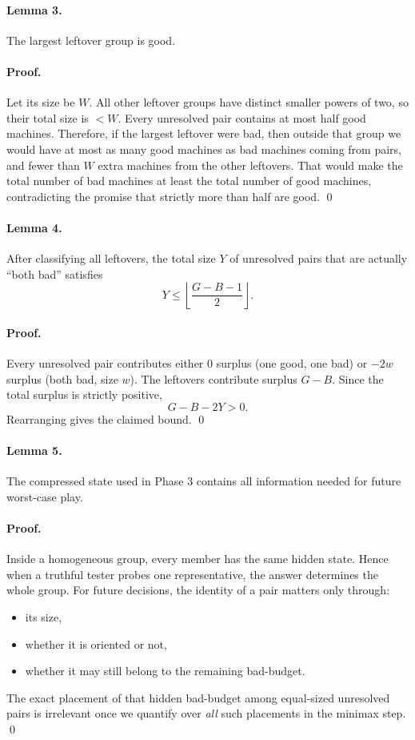 \documentclass[11pt]{article}
\begin{document}
\paragraph{Lemma 3.}
The largest leftover group is good.

\paragraph{Proof.}
Let its size be $W$. All other leftover groups have distinct smaller powers of two, so their total size is $< W$. Every unresolved pair contains at most half good machines. Therefore, if the largest leftover were bad, then outside that group we would have at most as many good machines as bad machines coming from pairs, and fewer than $W$ extra machines from the other leftovers. That would make the total number of bad machines at least the total number of good machines, contradicting the promise that strictly more than half are good. \qed

\paragraph{Lemma 4.}
After classifying all leftovers, the total size $Y$ of unresolved pairs that are actually ``both bad'' satisfies
\[
Y \le \left\lfloor \frac{G-B-1}{2} \right\rfloor .
\]

\paragraph{Proof.}
Every unresolved pair contributes either $0$ surplus (one good, one bad) or $-2w$ surplus (both bad, size $w$). The leftovers contribute surplus $G-B$. Since the total surplus is strictly positive,
\[
G-B-2Y > 0.
\]
Rearranging gives the claimed bound. \qed

\paragraph{Lemma 5.}
The compressed state used in Phase 3 contains all information needed for future worst-case play.

\paragraph{Proof.}
Inside a homogeneous group, every member has the same hidden state. Hence when a truthful tester probes one representative, the answer determines the whole group. For future decisions, the identity of a pair matters only through:
\begin{itemize}[leftmargin=*]
    \item its size,
    \item whether it is oriented or not,
    \item whether it may still belong to the remaining bad-budget.
\end{itemize}
The exact placement of that hidden bad-budget among equal-sized unresolved pairs is irrelevant once we quantify over \emph{all} such placements in the minimax step. \qed
\end{document}
